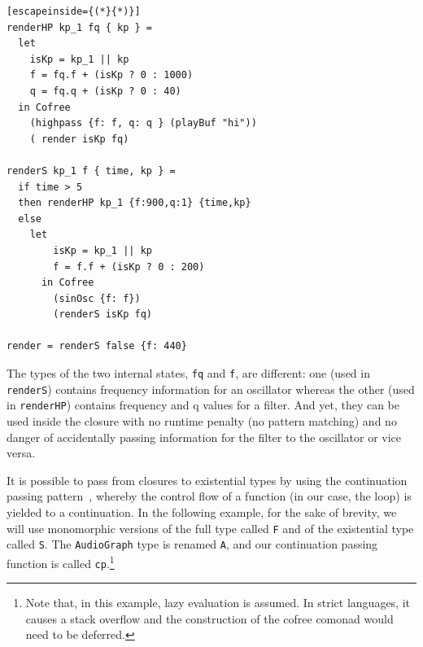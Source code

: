 \documentclass{article}
\begin{document}
\lstset{language=Haskell, style=psstyle}
\begin{lstlisting}[escapeinside={(*}{*)}]
renderHP kp_1 fq { kp } =
  let
    isKp = kp_1 || kp
    f = fq.f + (isKp ? 0 : 1000)
    q = fq.q + (isKp ? 0 : 40)
  in Cofree
    (highpass {f: f, q: q } (playBuf "hi"))
    ( render isKp fq)

renderS kp_1 f { time, kp } =
  if time > 5
  then renderHP kp_1 {f:900,q:1} {time,kp}
  else
    let
        isKp = kp_1 || kp
        f = f.f + (isKp ? 0 : 200)
      in Cofree
        (sinOsc {f: f})
        (renderS isKp fq)

render = renderS false {f: 440}
\end{lstlisting}

The types of the two internal states, \texttt{fq} and \texttt{f}, are different: one (used in \texttt{renderS}) contains frequency information for an oscillator whereas the other (used in \texttt{renderHP}) contains frequency and q values for a filter. And yet, they can be used inside the closure with no runtime penalty (no pattern matching) and no danger of accidentally passing information for the filter to the oscillator or vice versa.

It is possible to pass from closures to existential types by using the continuation passing pattern~\cite{sussman14ai}, whereby the control flow of a function (in our case, the loop) is yielded to a continuation. In the following example, for the sake of brevity, we will use monomorphic versions of the full type called \texttt{F} and of the existential type called \texttt{S}. The \texttt{AudioGraph} type is renamed \texttt{A}, and our continuation passing function is called \texttt{cp}.\footnote{Note that, in this example, lazy evaluation is assumed. In strict languages, it causes a stack overflow and the construction of the cofree comonad would need to be deferred.}
\end{document}
